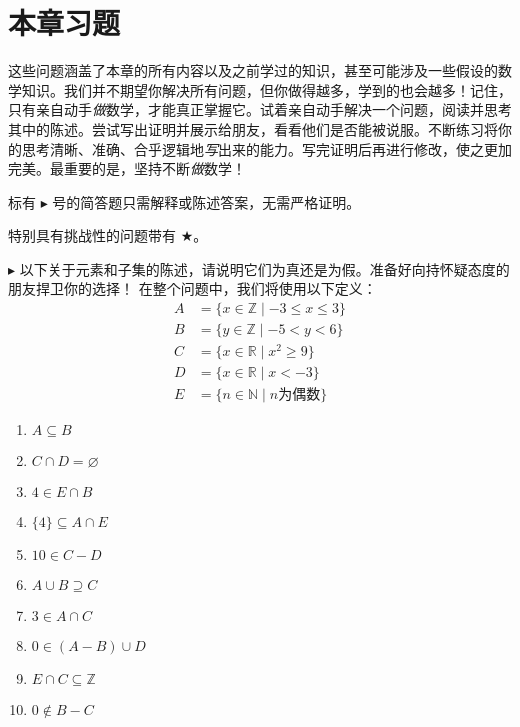 \section{本章习题}

这些问题涵盖了本章的所有内容以及之前学过的知识，甚至可能涉及一些假设的数学知识。我们并不期望你解决所有问题，但你做得越多，学到的也会越多！记住，只有亲自动手\emph{做}数学，才能真正掌握它。试着亲自动手解决一个问题，阅读并思考其中的陈述。尝试写出证明并展示给朋友，看看他们是否能被说服。不断练习将你的思考清晰、准确、合乎逻辑地\emph{写}出来的能力。写完证明后再进行修改，使之更加完美。最重要的是，坚持不断\emph{做}数学！

标有 $\blacktriangleright$ 号的简答题只需解释或陈述答案，无需严格证明。

特别具有挑战性的问题带有 $\bigstar$。

\begin{exercise}
    $\blacktriangleright$ 以下关于元素和子集的陈述，请说明它们为真还是为假。准备好向持怀疑态度的朋友捍卫你的选择！
    在整个问题中，我们将使用以下定义：
    \begin{align*}
        A &= \{x \in \mathbb{Z} \mid -3 \le x \le 3\} \\
        B &= \{y \in \mathbb{Z} \mid -5 < y < 6\} \\
        C &= \{x \in \mathbb{R} \mid x^2 \ge 9\} \\
	    D &= \{x \in \mathbb{R} \mid x < -3\} \\
        E &= \{n \in \mathbb{N} \mid n \text{为偶数} \}
    \end{align*}
    \begin{enumerate}[label=(\alph*)]
        \item $A \subseteq B$
        \item $C \cap D = \varnothing$
        \item $4 \in E \cap B$
        \item $\{4\} \subseteq A \cap E$
        \item $10 \in C - D$
        \item $A \cup B \supseteq C$
        \item $3 \in A \cap C$
        \item $0 \in (A - B) \cup D$
        \item $E \cap C \subseteq \mathbb{Z}$
        \item $0 \notin B - C$
    \end{enumerate}
\end{exercise}

